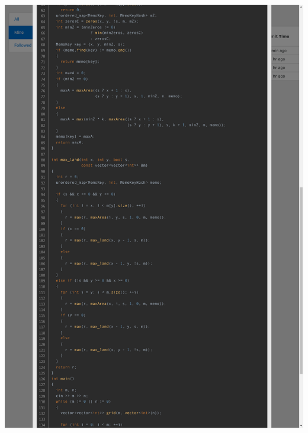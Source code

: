 \documentclass[a4paper, 12pt]{article}
\begin{document}
\includegraphics[clip, trim=40 0 40 25, width=17cm]{10074/submit-2.pdf}\vspace{-2cm}
\end{document}
